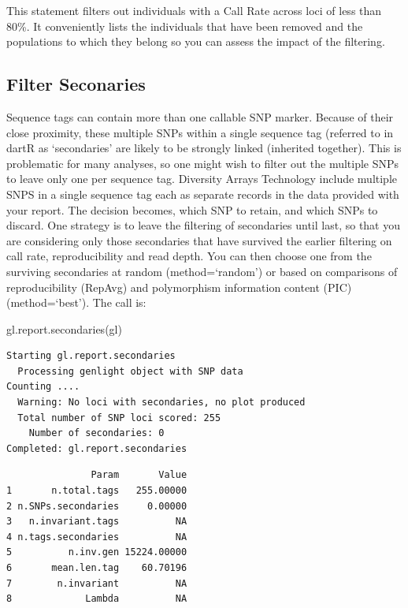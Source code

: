 \documentclass[
  letterpaper,
  DIV=11,
  numbers=noendperiod]{scrreprt}
\newenvironment{Shaded}{\begin{snugshade}}{\end{snugshade}}
\newcommand{\FunctionTok}[1]{\textcolor[rgb]{0.02,0.16,0.49}{#1}}
\newcommand{\NormalTok}[1]{\textcolor[rgb]{0.00,0.44,0.13}{#1}}
\begin{document}
This statement filters out individuals with a Call Rate across loci of
less than 80\%. It conveniently lists the individuals that have been
removed and the populations to which they belong so you can assess the
impact of the filtering.

\hypertarget{filter-seconaries}{%
\subsection*{Filter Seconaries}\label{filter-seconaries}}

Sequence tags can contain more than one callable SNP marker. Because of
their close proximity, these multiple SNPs within a single sequence tag
(referred to in dartR as `secondaries' are likely to be strongly linked
(inherited together). This is problematic for many analyses, so one
might wish to filter out the multiple SNPs to leave only one per
sequence tag. Diversity Arrays Technology include multiple SNPS in a
single sequence tag each as separate records in the data provided with
your report. The decision becomes, which SNP to retain, and which SNPs
to discard. One strategy is to leave the filtering of secondaries until
last, so that you are considering only those secondaries that have
survived the earlier filtering on call rate, reproducibility and read
depth. You can then choose one from the surviving secondaries at random
(method=`random') or based on comparisons of reproducibility (RepAvg)
and polymorphism information content (PIC) (method=`best'). The call is:

\begin{Shaded}
\begin{Highlighting}[]
\FunctionTok{gl.report.secondaries}\NormalTok{(gl)}
\end{Highlighting}
\end{Shaded}

\begin{verbatim}
Starting gl.report.secondaries 
  Processing genlight object with SNP data
Counting ....
  Warning: No loci with secondaries, no plot produced
  Total number of SNP loci scored: 255 
    Number of secondaries: 0 
Completed: gl.report.secondaries 
\end{verbatim}

\begin{verbatim}
               Param       Value
1       n.total.tags   255.00000
2 n.SNPs.secondaries     0.00000
3   n.invariant.tags          NA
4 n.tags.secondaries          NA
5          n.inv.gen 15224.00000
6       mean.len.tag    60.70196
7        n.invariant          NA
8             Lambda          NA
\end{verbatim}
\end{document}
